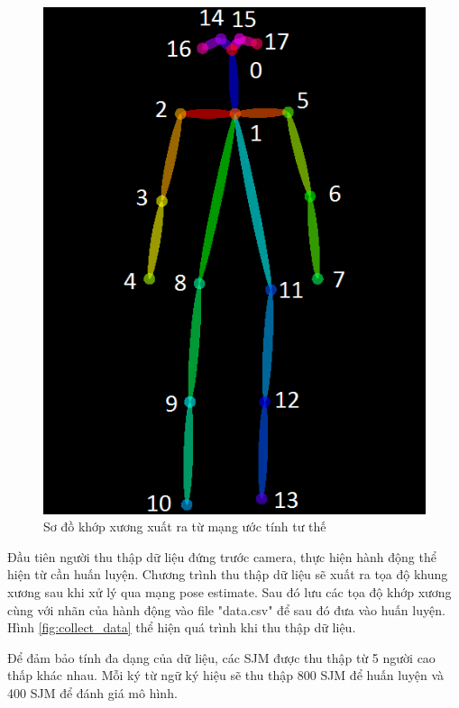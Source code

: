 \FloatBarrier
\begin{figure}[htp]
\begin{center}
\includegraphics[scale=0.6]{chap4/c4_figs/joints_order.png}
\end{center}
\caption{Sơ đồ khớp xương xuất ra từ mạng ước tính tư thế}
\label{fig:joints}
\end{figure}
\FloatBarrier

Đầu tiên người thu thập dữ liệu đứng trước camera, thực hiện hành động thể hiện từ cần huấn luyện. Chương trình thu thập dữ liệu sẽ xuất ra tọa độ khung xương sau khi xử lý qua mạng pose estimate. Sau đó lưu các tọa độ khớp xương cùng với nhãn của hành động vào file "data.csv" để sau đó đưa vào huấn luyện. Hình \ref{fig:collect_data} thể hiện quá trình khi thu thập dữ liệu.

Để đảm bảo tính đa dạng của dữ liệu, các SJM được thu thập từ 5 người cao thấp khác nhau. Mỗi ký từ ngữ ký hiệu sẽ thu thập 800 SJM  để huấn luyện và 400 SJM để đánh giá mô hình.

